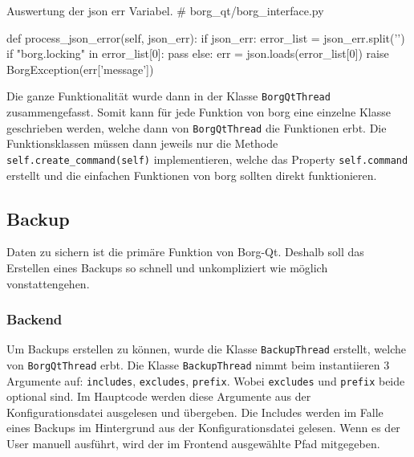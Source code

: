 \begin{sexylisting}[label=orgb83002e]{Auswertung der json err Variabel.}
# borg_qt/borg_interface.py

def process_json_error(self, json_err):
    if json_err:
        error_list = json_err.split('\n')
        if "borg.locking" in error_list[0]:
            pass
        else:
            err = json.loads(error_list[0])
            raise BorgException(err['message'])
\end{sexylisting}

Die ganze Funktionalität wurde dann in der Klasse \texttt{BorgQtThread}
zusammengefasst. Somit kann für jede Funktion von \gls{borg} eine einzelne Klasse
geschrieben werden, welche dann von \texttt{BorgQtThread} die Funktionen erbt. Die
Funktionsklassen müssen dann jeweils nur die Methode
\texttt{self.create\_command(self)} implementieren, welche das Property \texttt{self.command}
erstellt und die einfachen Funktionen von \gls{borg} sollten direkt funktionieren.

\newpage
\subsection{Backup}
\label{sec:org89c69ff}

Daten zu sichern ist die primäre Funktion von Borg-Qt. Deshalb soll das
Erstellen eines Backups so schnell und unkompliziert wie möglich
vonstattengehen.

\subsubsection{Backend}
\label{sec:orgf0c2da8}

Um Backups erstellen zu können, wurde die Klasse \texttt{BackupThread}
erstellt, welche von \texttt{BorgQtThread} erbt. Die Klasse
\texttt{BackupThread} nimmt beim instantiieren 3 Argumente auf:
\texttt{includes}, \texttt{excludes}, \texttt{prefix}. Wobei \texttt{excludes}
und \texttt{prefix} beide optional sind. Im Hauptcode werden diese Argumente
aus der Konfigurationsdatei ausgelesen und übergeben. Die Includes werden im
Falle eines Backups im Hintergrund aus der Konfigurationsdatei gelesen. Wenn es
der User manuell ausführt, wird der im Frontend ausgewählte Pfad mitgegeben.

